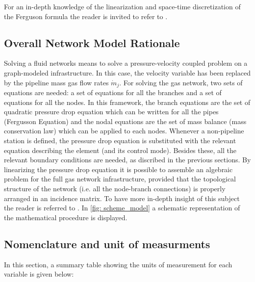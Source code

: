 For an in-depth knowledge of the linearization and space-time discretization of the Ferguson formula the reader is invited to refer to \cite{Cavana2020} \cite{GREENSTREAM}.


\subsection{Overall Network Model Rationale}
\label{sec:NetwModRationale}


Solving a fluid networks means to solve a pressure-velocity coupled problem on a graph-modeled infrastructure. 
In this case, the velocity variable has been replaced by the pipeline mass gas flow rates $\dot{m}_j$. For solving the gas network, two sets of equations are needed: a set of equations for all the branches and a set of equations for all the nodes. 
In this framework, the branch equations are the set of quadratic pressure drop equation which can be written for all the pipes (Fergusson Equation) and the nodal equations are the set of mass balance (mass conservation law) which can be applied to each nodes. Whenever a non-pipeline station is defined, the pressure drop equation is substituted with the relevant equation describing the element (and its control mode). Besides these, all the relevant boundary conditions are needed, as discribed in the previous sections.
By linearizing the pressure drop equation it is possible to assemble an algebraic problem for the full gas network infrastructure, provided that the topological structure of the network (i.e. all the node-branch connections) is properly arranged in an incidence matrix. To have more in-depth insight of this subject the reader is referred to \cite{GREENSTREAM}. In \ref{fig: scheme_model} a schematic representation of the mathematical procedure is displayed.


\subsection{Nomenclature and unit of measurments}
\label{sec:NomAndUDM}

In this section, a summary table showing the units of measurement for each variable is given below:

